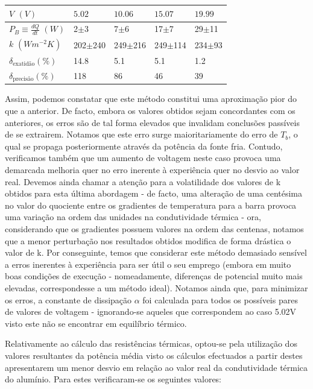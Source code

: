 \documentclass[8pt]{extarticle}
\begin{document}
\begin{multicols}{2}
{\small
\begin{center}
\begin{tabular}{ x{1.9cm} x{1.2cm} x{1.2cm} x{1.2cm} x{1cm} } 
$V$ $(V)$ & $5.02$ & $10.06$ & $15.07$ & $19.99$ \tabularnewline
\hline \hline
$P_B\equiv\frac{dQ}{dt}$ $(W)$ & 2$\pm$3 & 7$\pm$6 & 17$\pm$7   & 29$\pm$11 \tabularnewline
$k$ $(Wm^{-2}K)$ & 202$\pm$240 & 249$\pm$216 & 249$\pm$114 & 234$\pm$93 \tabularnewline
$\delta_\text{exatidão} (\%)$ & 14.8  & 5.1 & 5.1 & 1.2 \tabularnewline
$\delta_\text{precisão} (\%)$ & 118 & 86 & 46 & 39 \tabularnewline
\end{tabular}
\par{}
\end{center}
}

\par Assim, podemos constatar que este método constitui uma aproximação pior do que a anterior. De facto, embora os valores obtidos sejam concordantes com os anteriores, os erros são de tal forma elevados que invalidam conclusões passíveis de se extrairem. Notamos que este erro surge maioritariamente do erro de $T_b$, o qual se propaga posteriormente através da potência da fonte fria. Contudo, verificamos também que um aumento de voltagem neste caso provoca uma demarcada melhoria quer no erro inerente à experiência quer no desvio ao valor real. Devemos ainda chamar a atenção para a volatilidade dos valores de k obtidos para esta última abordagem - de facto, uma alteração de uma centésima no valor do quociente entre os gradientes de temperatura para a barra provoca uma variação na ordem das unidades na condutividade térmica - ora, considerando que os gradientes possuem valores na ordem das centenas, notamos que a menor perturbação nos resultados obtidos modifica de forma drástica o valor de k. Por conseguinte, temos que considerar este método demasiado sensível a erros inerentes à experiência para ser útil o seu emprego (embora em muito boas condições de execução - nomeadamente, diferenças de potencial muito mais elevadas, correspondesse a um método ideal). Notamos ainda que, para minimizar os erros, a constante de dissipação $\alpha$ foi calculada para todos os possíveis pares de valores de voltagem - ignorando-se aqueles que correspondem ao caso 5.02V visto este não se encontrar em equilíbrio térmico. 

\par Relativamente ao cálculo das resistências térmicas, optou-se pela utilização dos valores resultantes da potência média visto os cálculos efectuados a partir destes apresentarem um menor desvio em relação ao valor real da condutividade térmica do alumínio. Para estes verificaram-se os seguintes valores:


\end{multicols}
\end{document}
